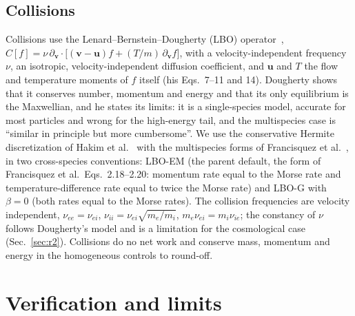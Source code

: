 \documentclass[aps,pre,reprint,floatfix,amsmath,amssymb,nofootinbib,superscriptaddress]{revtex4-2}
\begin{document}
\subsection{Collisions}
Collisions use the Lenard--Bernstein--Dougherty (LBO) operator~\cite{Dougherty1964}, $C[f]=\nu\,\partial_{\mathbf v}\!\cdot\!\big[(\mathbf v-\mathbf u)f+(T/m)\,\partial_{\mathbf v}f\big]$, with a velocity-independent frequency $\nu$, an isotropic, velocity-independent diffusion coefficient, and $\mathbf u$ and $T$ the flow and temperature moments of $f$ itself (his Eqs.~7--11 and 14). Dougherty shows that it conserves number, momentum and energy and that its only equilibrium is the Maxwellian, and he states its limits: it is a single-species model, accurate for most particles and wrong for the high-energy tail, and the multispecies case is ``similar in principle but more cumbersome''. We use the conservative Hermite discretization of Hakim et al.~\cite{Hakim2020} with the multispecies forms of Francisquez et al.~\cite{Francisquez2022}, in two cross-species conventions: LBO-EM (the parent default, the form of Francisquez et al.\ Eqs.~2.18--2.20: momentum rate equal to the Morse rate and temperature-difference rate equal to twice the Morse rate) and LBO-G with $\beta=0$ (both rates equal to the Morse rates). The collision frequencies are velocity independent, $\nu_{ee}=\nu_{ei}$, $\nu_{ii}=\nu_{ei}\sqrt{m_e/m_i}$, $m_e\nu_{ei}=m_i\nu_{ie}$; the constancy of $\nu$ follows Dougherty's model and is a limitation for the cosmological case (Sec.~\ref{sec:r2}). Collisions do no net work and conserve mass, momentum and energy in the homogeneous controls to round-off.

\section{Verification and limits}\label{sec:verify}
\end{document}
